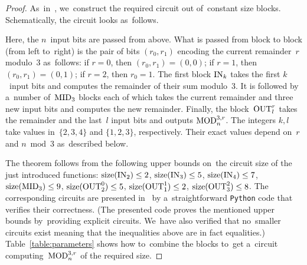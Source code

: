 \begin{proof}
As~in~\cite{DBLP:conf/sat/KojevnikovKY09},
we~construct the required circuit out of~constant size blocks. Schematically, the circuit looks as~follows.

\begin{center}
\end{center}
%
Here, the $n$~input bits are passed from above.
What is passed from block to block (from left to~right)
is the pair of bits $(r_0, r_1)$ encoding the current remainder~$r$ modulo~$3$ as~follows: if $r=0$, then $(r_0,r_1)=(0,0)$; if $r=1$, then $(r_0,r_1)=(0,1)$; if $r=2$, then $r_0=1$. The first block $\operatorname{IN}_k$ takes the first $k$~input bits and computes the remainder of their sum modulo~$3$. It is followed by a~number of~$\operatorname{MID}_3$ blocks each of which takes the current remainder and three new input bits and computes the new remainder. Finally, the block~$\operatorname{OUT}_l^r$ takes the remainder and the last~$l$ input bits and outputs $\operatorname{MOD}_n^{3,r}$. The integers $k,l$ take values in~$\{2,3,4\}$ and $\{1,2,3\}$, respectively. Their exact values depend on~$r$ and $n \bmod 3$ as~described below.

The theorem follows from the following upper bounds
on~the circuit size of the just introduced functions:
$\operatorname{size}(\operatorname{IN}_2) \le 2$,
$\operatorname{size}(\operatorname{IN}_3) \le 5$,
$\operatorname{size}(\operatorname{IN}_4) \le 7$,
$\operatorname{size}(\operatorname{MID}_3) \le 9$,
$\operatorname{size}(\operatorname{OUT}_2^0) \le 5$,
$\operatorname{size}(\operatorname{OUT}_1^1) \le 2$,
$\operatorname{size}(\operatorname{OUT}_3^2) \le 8$.
The corresponding circuits are presented in~\cite{DBLP:journals/corr/abs-2102-12579}
by a~straightforward \texttt{Python} code that verifies their correctness. (The presented code proves the mentioned upper bounds by~providing explicit circuits. We~have also verified that no~smaller circuits exist meaning that the
inequalities above are in fact equalities.)
%
Table~\ref{table:parameters} shows how to~combine
the blocks to~get a~circuit computing~$\operatorname{MOD}_n^{3,r}$ of the required size.


\end{proof}
